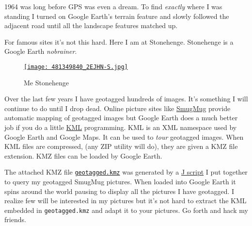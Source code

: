 1964 was long before GPS was even a dream. To find \emph{exactly} where
I was standing I turned on Google Earth's terrain feature and slowly
followed the adjacent road until all the landscape features matched up.

For famous sites it's not this hard. Here I am at Stonehenge. Stonehenge
is a Google Earth \emph{nobrainer}.


\begin{figure}[htbp]
\centering
\href{http://conceptcontrol.smugmug.com/Themes/Diaries/Been-There-Done-That-1/7414505\_n9vNC\#481349840\_2EJHN}{\texttt{[image: 481349840\_2EJHN-S.jpg]}}
\caption{Me  Stonehenge}
\label{fig:119X1}
\end{figure}



Over the last few years I have geotagged hundreds of images. It's
something I will continue to do until I drop dead. Online picture sites
like \href{http://www.smugmug.com/}{SmugMug} provide automatic mapping
of geotagged images but Google Earth does a much better job if you do a
little
\href{http://code.google.com/apis/kml/documentation/kml\_tut.html}{KML}
programming. KML is an XML namespace used by Google Earth and Google
Maps. It can be used to \emph{tour} geotagged images. When KML files are
compressed, (any ZIP utility will do), they are given a KMZ file
extension. KMZ files can be loaded by Google Earth.

The attached KMZ file
\href{http://www.box.net/shared/xha0totm6f}{\texttt{geotagged.kmz}} was generated
by a \href{http://www.box.net/shared/vhog7606hy}{J script} I put
together to query my geotagged SmugMug pictures. When loaded into Google
Earth it spins around the world pausing to display all the pictures I
have geotagged. I realize few will be interested in my pictures but it's
not hard to extract the KML embedded in \texttt{geotagged.kmz} and adapt
it to your pictures. Go forth and hack my friends.




%